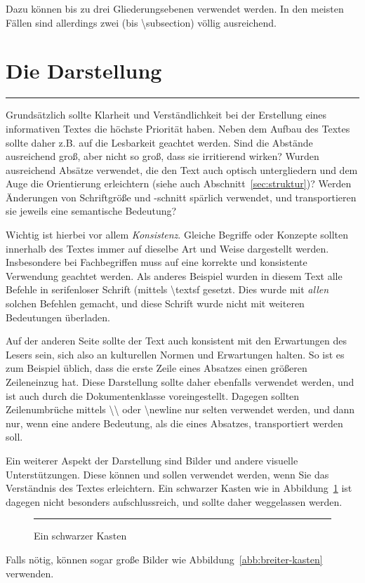 \documentclass[draft]{tcs-seminar}
\begin{document}
Dazu können bis zu drei Gliederungsebenen verwendet werden.
In den meisten Fällen sind allerdings zwei
(bis \textsf{\textbackslash subsection}) völlig ausreichend.


\section{Die Darstellung}

\begin{figure*}[t]
  \centering
  \rule{12cm}{2cm}
  \caption{Ein breiter, schwarzer Kasten}
  \label{abb:breiter-kasten}
\end{figure*}
Grundsätzlich sollte Klarheit und Verständlichkeit bei der Erstellung eines
informativen Textes die höchste Priorität haben.
Neben dem Aufbau des Textes sollte daher
z.B. auf die Lesbarkeit geachtet werden.
Sind die Abstände ausreichend groß,
aber nicht so groß, dass sie irritierend wirken?
Wurden ausreichend Absätze verwendet, die den Text auch optisch untergliedern
und dem Auge die Orientierung erleichtern (siehe auch Abschnitt~\ref{sec:struktur})?
Werden Änderungen von Schriftgröße und -schnitt spärlich verwendet,
und transportieren sie jeweils eine semantische Bedeutung?

Wichtig ist hierbei vor allem \emph{Konsistenz}.
Gleiche Begriffe oder Konzepte sollten innerhalb des Textes
immer auf dieselbe Art und Weise dargestellt werden.
Insbesondere bei Fachbegriffen muss auf eine korrekte
und konsistente Verwendung geachtet werden.
Als anderes Beispiel wurden in diesem Text alle Befehle
in serifenloser Schrift (mittels \textsf{\textbackslash textsf} gesetzt.
Dies wurde mit \emph{allen} solchen Befehlen gemacht,
und diese Schrift wurde nicht mit weiteren Bedeutungen überladen.

Auf der anderen Seite sollte der Text auch konsistent mit den Erwartungen
des Lesers sein, sich also an kulturellen Normen und Erwartungen halten.
So ist es zum Beispiel üblich, dass die erste Zeile eines Absatzes
einen größeren Zeileneinzug hat.
Diese Darstellung sollte daher ebenfalls verwendet werden,
und ist auch durch die Dokumentenklasse voreingestellt.
Dagegen sollten Zeilenumbrüche mittels \textsf{\textbackslash \textbackslash}
oder \textsf{\textbackslash newline} nur selten verwendet werden,
und dann nur, wenn eine andere Bedeutung, als die eines Absatzes,
transportiert werden soll.

Ein weiterer Aspekt der Darstellung sind Bilder
und andere visuelle Unterstützungen.
Diese können und sollen verwendet werden,
wenn Sie das Verständnis des Textes erleichtern.
Ein schwarzer Kasten wie in Abbildung~\ref{abb:kasten} ist dagegen nicht
besonders aufschlussreich, und sollte daher weggelassen werden.
\begin{figure}
  \centering
  \rule{3cm}{2cm}
  \caption{Ein schwarzer Kasten}
  \label{abb:kasten}
\end{figure}
Falls nötig, können sogar große Bilder wie Abbildung~\ref{abb:breiter-kasten}
verwenden.
\end{document}
